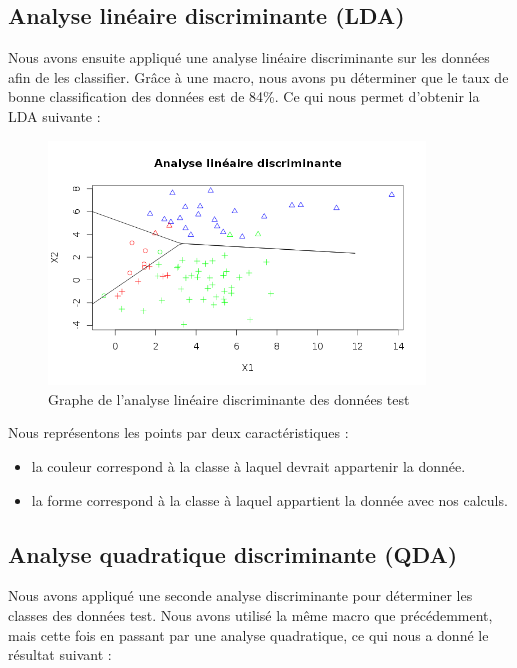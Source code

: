 \documentclass[a4paper,11pt]{article}
\begin{document}
  \subsection{Analyse linéaire discriminante (LDA)}
  
  Nous avons ensuite appliqué une analyse linéaire discriminante sur
  les données afin de les classifier. Grâce à une macro, nous avons pu
  déterminer que le taux de bonne classification des données est de
  84\%. Ce qui nous permet d'obtenir la LDA suivante :\\

  \begin{figure}[H]
   \centering
   \includegraphics[width=10cm]{lineaire_discri.png}
   \caption{Graphe de l'analyse linéaire discriminante des données test}
  \end{figure}

  Nous représentons les points par deux caractéristiques :
  \begin{itemize}
   \item la couleur correspond à la classe à laquel devrait appartenir la donnée.
   \item la forme correspond à la classe à laquel appartient la donnée avec nos calculs.
  \end{itemize}
  
  
  \subsection{Analyse quadratique discriminante (QDA)}
  
  Nous avons appliqué une seconde analyse discriminante pour
  déterminer les classes des données test.  Nous avons utilisé la même
  macro que précédemment, mais cette fois en passant par une analyse
  quadratique, ce qui nous a donné le résultat suivant :\\
  
\end{document}
